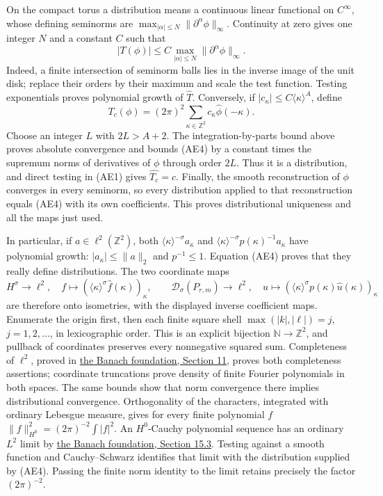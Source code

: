 \documentclass[
  11pt,
]{article}
\begin{document}
On the compact torus a distribution means a continuous linear functional
on \(C^\infty\), whose defining seminorms are
\(\max_{|\alpha|\leq N}\|\partial^\alpha\phi\|_\infty\). Continuity at
zero gives one integer \(N\) and a constant \(C\) such that \[
 |T(\phi)|\leq C\max_{|\alpha|\leq N}
                    \|\partial^\alpha\phi\|_\infty.
 \tag{AE3}
\] Indeed, a finite intersection of seminorm balls lies in the inverse
image of the unit disk; replace their orders by their maximum and scale
the test function. Testing exponentials proves polynomial growth of
\(\widehat T\). Conversely, if
\(|c_\kappa|\leq C\langle\kappa\rangle^A\), define \[
 T_c(\phi)=(2\pi)^2\sum_{\kappa\in\mathbb Z^2}
                        c_\kappa\widehat\phi(-\kappa).
 \tag{AE4}
\] Choose an integer \(L\) with \(2L>A+2\). The integration-by-parts
bound above proves absolute convergence and bounds (AE4) by a constant
times the supremum norms of derivatives of \(\phi\) through order
\(2L\). Thus it is a distribution, and direct testing in (AE1) gives
\(\widehat{T_c}=c\). Finally, the smooth reconstruction of \(\phi\)
converges in every seminorm, so every distribution applied to that
reconstruction equals (AE4) with its own coefficients. This proves
distributional uniqueness and all the maps just used.

In particular, if \(a\in\ell^2(\mathbb Z^2)\), both
\(\langle\kappa\rangle^{-\sigma}a_\kappa\) and
\(\langle\kappa\rangle^{-\sigma}p(\kappa)^{-1}a_\kappa\) have polynomial
growth: \(|a_\kappa|\leq\|a\|_2\) and \(p^{-1}\leq1\). Equation (AE4)
proves that they really define distributions. The two coordinate maps \[
 H^\sigma\longrightarrow\ell^2,\quad
 f\longmapsto(\langle\kappa\rangle^\sigma\widehat f(\kappa))_\kappa,
 \qquad
 \mathcal D_\sigma(P_{r,m})\longrightarrow\ell^2,\quad
 u\longmapsto(\langle\kappa\rangle^\sigma p(\kappa)
                                      \widehat u(\kappa))_\kappa
 \tag{AE5}
\] are therefore onto isometries, with the displayed inverse coefficient
maps. Enumerate the origin first, then each finite square shell
\(\max(|k|,|\ell|)=j\), \(j=1,2,\ldots\), in lexicographic order. This
is an explicit bijection \(\mathbb N\to\mathbb Z^2\), and pullback of
coordinates preserves every nonnegative squared sum. Completeness of
\(\ell^2\), proved in
\href{banach-foundation-bridges.pdf\#section*.26}{the
Banach foundation, Section 11}, proves both completeness assertions;
coordinate truncations prove density of finite Fourier polynomials in
both spaces. The same bounds show that norm convergence there implies
distributional convergence. Orthogonality of the characters, integrated
with ordinary Lebesgue measure, gives for every finite polynomial \(f\)
\(\|f\|_{H^0}^2=(2\pi)^{-2}\int|f|^2\). An \(H^0\)-Cauchy polynomial
sequence has an ordinary \(L^2\) limit by
\href{banach-foundation-bridges.pdf\#section*.94}{the
Banach foundation, Section 15.3}. Testing against a smooth function and
Cauchy--Schwarz identifies that limit with the distribution supplied by
(AE4). Passing the finite norm identity to the limit retains precisely
the factor \((2\pi)^{-2}\).
\end{document}
